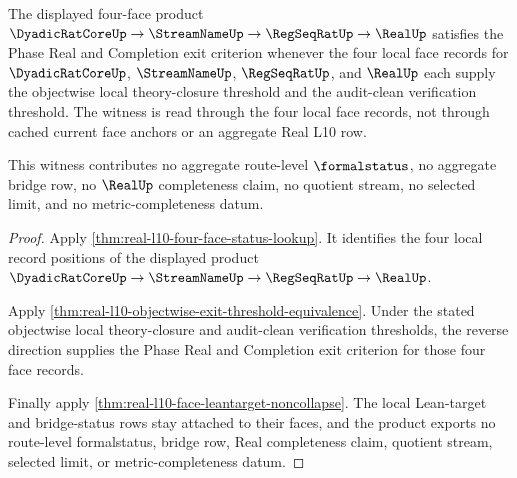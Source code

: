 \begin{theorem}
\label{thm:real-l10-current-phase-exit-witness}
The displayed four-face product
$\DyadicRatCoreUp \to \StreamNameUp \to \RegSeqRatUp \to \RealUp$
satisfies the Phase Real and Completion exit criterion whenever the four
local face records for $\DyadicRatCoreUp$, $\StreamNameUp$,
$\RegSeqRatUp$, and $\RealUp$ each supply the objectwise local
theory-closure threshold and the audit-clean verification threshold. The
witness is read through the four local face records, not through cached
current face anchors or an aggregate Real L10 row.

This witness contributes no aggregate route-level $\formalstatus$, no
aggregate bridge row, no $\RealUp$ completeness claim, no quotient stream, no
selected limit, and no metric-completeness datum.
\end{theorem}
\begin{proof}
Apply \autoref{thm:real-l10-four-face-status-lookup}. It identifies the four
local record positions of the displayed product
$\DyadicRatCoreUp \to \StreamNameUp \to \RegSeqRatUp \to \RealUp$.

Apply \autoref{thm:real-l10-objectwise-exit-threshold-equivalence}. Under the
stated objectwise local theory-closure and audit-clean verification
thresholds, the reverse direction supplies the Phase Real and Completion exit
criterion for those four face records.

Finally apply \autoref{thm:real-l10-face-leantarget-noncollapse}. The local
Lean-target and bridge-status rows stay attached to their faces, and the
product exports no route-level formalstatus, bridge row, Real completeness
claim, quotient stream, selected limit, or metric-completeness datum.
\end{proof}

